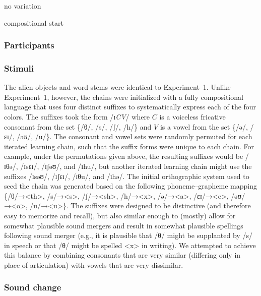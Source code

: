 \documentclass[doc,biblatex]{apa7}
\begin{document}
no variation

compositional start

\subsubsection{Participants}

\subsubsection{Stimuli}

The alien objects and word stems were identical to Experiment~1. Unlike Experiment~1, however, the chains were initialized with a fully compositional language that uses four distinct suffixes to systematically express each of the four colors. The suffixes took the form /ɪ\textit{CV}/ where $C$ is a voiceless fricative consonant from the set \{/θ/, /s/, /ʃ/, /h/\} and $V$ is a vowel from the set \{/ə/, /ɛɪ/, /əʊ/, /u/\}. The consonant and vowel sets were randomly permuted for each iterated learning chain, such that the suffix forms were unique to each chain. For example, under the permutations given above, the resulting suffixes would be /ɪθə/, /ɪsɛɪ/, /ɪʃəʊ/, and /ɪhu/, but another iterated learning chain might use the suffixes /ɪsəʊ/, /ɪʃɛɪ/, /ɪθu/, and /ɪhə/. The initial orthographic system used to seed the chain was generated based on the following phoneme–grapheme mapping \{/θ/→<th>, /s/→<s>, /ʃ/→<sh>, /h/→<x>, /ə/→<a>, /ɛɪ/→<e>, /əʊ/→<o>, /u/→<u>\}. The suffixes were designed to be distinctive (and therefore easy to memorize and recall), but also similar enough to (mostly) allow for somewhat plausible sound mergers and result in somewhat plausible spellings following sound merger (e.g., it is plausible that /θ/ might be supplanted by /s/ in speech or that /θ/ might be spelled <x> in writing). We attempted to achieve this balance by combining consonants that are very similar (differing only in place of articulation) with vowels that are very dissimilar.

\subsubsection{Sound change}
\end{document}
